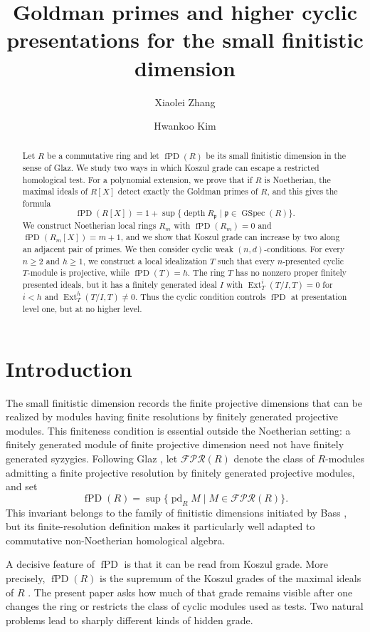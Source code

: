 \documentclass[11pt]{amsart}
\title[Goldman primes and cyclic presentations]
{Goldman primes and higher cyclic presentations for the small finitistic dimension}
\author{Xiaolei Zhang}
\author{Hwankoo Kim}
\numberwithin{equation}{section}
\theoremstyle{definition}
\theoremstyle{remark}
\newcommand{\fPD}{\operatorname{fPD}}
\newcommand{\pd}{\operatorname{pd}}
\newcommand{\Ext}{\operatorname{Ext}}
\newcommand{\GSpec}{\operatorname{GSpec}}
\newcommand{\depth}{\operatorname{depth}}
\newcommand{\FPR}{\mathcal{FPR}}
\begin{document}
\begin{abstract}
Let $R$ be a commutative ring and let $\fPD(R)$ be its small finitistic dimension in the sense of Glaz.  We study two ways in which Koszul grade can escape a restricted homological test.  For a polynomial extension, we prove that if $R$ is Noetherian, the maximal ideals of $R[X]$ detect exactly the Goldman primes of $R$, and this gives the formula
\[
 \fPD(R[X])
 =1+\sup\{\depth R_{\mathfrak p}\mid \mathfrak p\in\GSpec(R)\}.
\]
We construct Noetherian local rings $R_m$ with $\fPD(R_m)=0$ and $\fPD(R_m[X])=m+1$, and we show that Koszul grade can increase by two along an adjacent pair of primes.  We then consider cyclic weak $(n,d)$-conditions.  For every $n\geq2$ and $h\geq1$, we construct a local idealization $T$ such that every $n$-presented cyclic $T$-module is projective, while $\fPD(T)=h$.  The ring $T$ has no nonzero proper finitely presented ideals, but it has a finitely generated ideal $I$ with $\Ext_T^i(T/I,T)=0$ for $i<h$ and $\Ext_T^h(T/I,T)\neq0$.  Thus the cyclic condition controls $\fPD$ at presentation level one, but at no higher level.
\end{abstract}

\maketitle

\section{Introduction}\label{sec:introduction}

The small finitistic dimension records the finite projective dimensions that can be realized by modules having finite resolutions by finitely generated projective modules.  This finiteness condition is essential outside the Noetherian setting: a finitely generated module of finite projective dimension need not have finitely generated syzygies.  Following Glaz \cite{Glaz}, let $\FPR(R)$ denote the class of $R$-modules admitting a finite projective resolution by finitely generated projective modules, and set
\[
 \fPD(R)=\sup\{\pd_R M\mid M\in\FPR(R)\}.
\]
This invariant belongs to the family of finitistic dimensions initiated by Bass \cite{Bass}, but its finite-resolution definition makes it particularly well adapted to commutative non-Noetherian homological algebra.

A decisive feature of $\fPD$ is that it can be read from Koszul grade.  More precisely, $\fPD(R)$ is the supremum of the Koszul grades of the maximal ideals of $R$ \cite{ZhangWang,ZhangII}.  The present paper asks how much of that grade remains visible after one changes the ring or restricts the class of cyclic modules used as tests.  Two natural problems lead to sharply different kinds of hidden grade.
\end{document}
